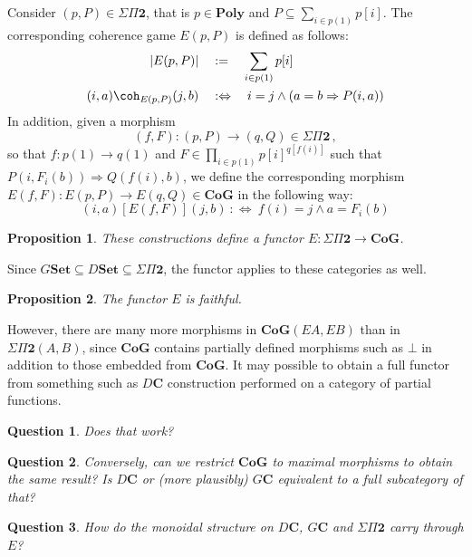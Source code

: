 \documentclass{article}
\newtheorem{proposition}{Proposition}
\newtheorem{question}{Question}
\begin{document}
Consider $(p, P) \in \Sigma \Pi \mathbf{2}$,
that is $p \in \mathbf{Poly}$
and $P \subseteq \sum_{i \in p(1)} p[i]$.
The corresponding coherence game
$E(p, P)$
is defined as follows:
\begin{align*}
  |E (p, P)| \quad &:= \quad \sum_{i \in p(1)} p[i] \\
  (i, a) \coh_{E (p, P)} (j, b) \quad &:\Leftrightarrow\quad
    i = j \wedge (a = b \Rightarrow P(i, a))
\end{align*}
In addition,
given a morphism
\[ (f, F) : (p, P) \rightarrow (q, Q) \in \Sigma\Pi\mathbf{2}\,, \]
so that $f : p(1) \rightarrow q(1)$
and $F \in \prod_{i \in p(1)} p[i]^{q[f(i)]}$
such that $P(i, F_i(b)) \Rightarrow Q(f(i), b)$,
we define the corresponding morphism
$E (f, F) : E (p, P) \rightarrow E (q, Q) \in \mathbf{CoG}$
in the following way:
\[
  (i, a) \mathrel{[E (f, F)]} (j, b)
    \::\Leftrightarrow\:
    f(i) = j \wedge a = F_i(b)
\]

\begin{proposition}
These constructions define a functor
$E : \Sigma\Pi\mathbf{2} \rightarrow \mathbf{CoG}$.
\end{proposition}

Since
$G\mathbf{Set} \subseteq D\mathbf{Set} \subseteq \Sigma\Pi\mathbf{2}$,
the functor applies to these categories as well.

\begin{proposition}
The functor $E$ is faithful.
\end{proposition}

However,
there are many more morphisms in $\mathbf{CoG}(E A, E B)$
than in $\Sigma\Pi\mathbf{2}(A, B)$,
since $\mathbf{CoG}$ contains partially defined morphisms
such as $\bot$ in addition to those embedded from $\mathbf{CoG}$.
It may possible to obtain a full functor
from something such as $D \mathbf{C}$ construction
performed on a category of partial functions.

\begin{question}
Does that work?
\end{question}

\begin{question}
Conversely,
can we restrict $\mathbf{CoG}$ to maximal morphisms
to obtain the same result?
Is $D\mathbf{C}$ or (more plausibly) $G\mathbf{C}$
equivalent to a full subcategory of that?
\end{question}

\begin{question}
How do the monoidal structure on
$D\mathbf{C}$,
$G\mathbf{C}$ and
$\Sigma\Pi\mathbf{2}$
carry through $E$?
\end{question}
\end{document}
